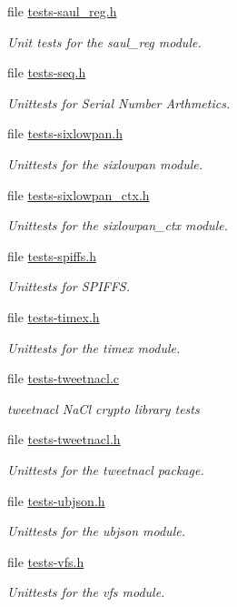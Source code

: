 \begin{DoxyCompactItemize}
file \hyperlink{tests-saul__reg_8h}{tests-\/saul\+\_\+reg.\+h}
\begin{DoxyCompactList}\small\item\em Unit tests for the {\ttfamily saul\+\_\+reg} module. \end{DoxyCompactList}\item 
file \hyperlink{tests-seq_8h}{tests-\/seq.\+h}
\begin{DoxyCompactList}\small\item\em Unittests for Serial Number Arthmetics. \end{DoxyCompactList}\item 
file \hyperlink{tests-sixlowpan_8h}{tests-\/sixlowpan.\+h}
\begin{DoxyCompactList}\small\item\em Unittests for the {\ttfamily sixlowpan} module. \end{DoxyCompactList}\item 
file \hyperlink{tests-sixlowpan__ctx_8h}{tests-\/sixlowpan\+\_\+ctx.\+h}
\begin{DoxyCompactList}\small\item\em Unittests for the {\ttfamily sixlowpan\+\_\+ctx} module. \end{DoxyCompactList}\item 
file \hyperlink{tests-spiffs_8h}{tests-\/spiffs.\+h}
\begin{DoxyCompactList}\small\item\em Unittests for S\+P\+I\+F\+FS. \end{DoxyCompactList}\item 
file \hyperlink{tests-timex_8h}{tests-\/timex.\+h}
\begin{DoxyCompactList}\small\item\em Unittests for the {\ttfamily timex} module. \end{DoxyCompactList}\item 
file \hyperlink{tests-tweetnacl_8c}{tests-\/tweetnacl.\+c}
\begin{DoxyCompactList}\small\item\em tweetnacl Na\+Cl crypto library tests \end{DoxyCompactList}\item 
file \hyperlink{tests-tweetnacl_8h}{tests-\/tweetnacl.\+h}
\begin{DoxyCompactList}\small\item\em Unittests for the {\ttfamily tweetnacl} package. \end{DoxyCompactList}\item 
file \hyperlink{tests-ubjson_8h}{tests-\/ubjson.\+h}
\begin{DoxyCompactList}\small\item\em Unittests for the {\ttfamily ubjson} module. \end{DoxyCompactList}\item 
file \hyperlink{tests-vfs_8h}{tests-\/vfs.\+h}
\begin{DoxyCompactList}\small\item\em Unittests for the {\ttfamily vfs} module. \end{DoxyCompactList}\end{DoxyCompactItemize}
